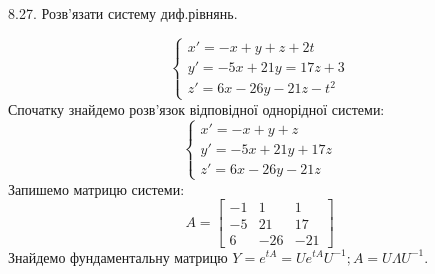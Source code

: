 \documentclass[14pt,a4paper]{scrartcl}
\theoremstyle{definition}
\theoremstyle{remark}
\theoremstyle{definition}
\theoremstyle{definition}
\begin{document}
\pagebreak

8.27. Розв'язати систему диф.рівнянь.

$$
\left\lbrace
\begin{gathered}
 x' = -x + y + z + 2t \\
 y' = -5x + 21 y = 17z + 3\\
 z' = 6x - 26y - 21z -t^2
\end{gathered} \right.
$$
Спочатку знайдемо розв'язок відповідної однорідної системи:
$$
\left\lbrace
\begin{gathered}
 x' = -x + y + z\\
 y' = -5x + 21 y + 17z\\
 z' = 6x - 26y - 21z
\end{gathered} \right.
$$
Запишемо матрицю системи:
$$
A = \begin{bmatrix}
 -1 & 1 & 1 \\
 -5 & 21 & 17 \\
 6 & -26 & -21
\end{bmatrix}
$$
Знайдемо фундаментальну матрицю $Y = e^{tA} = U e^{tA} U^{-1}; A = U \Lambda U^{-1}$.
\end{document}
